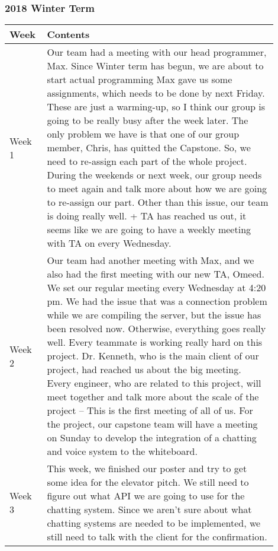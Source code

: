 \documentclass[10pt]{article}
\begin{document}
        \subsubsection{2018 Winter Term}
            \begin{center}
            \begin{tabular}{ | p{0.1\linewidth} | p{0.8\linewidth} | } \hline
                Week & Contents  \\ \hline
                Week 1 &  Our team had a meeting with our head programmer, Max. Since Winter term has begun, we are about to start actual programming
                Max gave us some assignments, which needs to be done by next Friday.
                These are just a warming-up, so I think our group is going to be really busy after the week later.
                The only problem we have is that one of our group member, Chris, has quitted the Capstone.
                So, we need to re-assign each part of the whole project.
                During the weekends or next week, our group needs to meet again and talk more about how we are going to re-assign our part.
                Other than this issue, our team is doing really well.
                + TA has reached us out, it seems like we are going to have a weekly meeting with TA on every Wednesday.  \\ \hline
                Week 2 &  Our team had another meeting with Max, and we also had the first meeting with our new TA, Omeed.
                We set our regular meeting every Wednesday at 4:20 pm.
                We had the issue that was a connection problem while we are compiling the server, but the issue has been resolved now.
                Otherwise, everything goes really well. Every teammate is working really hard on this project.
                Dr. Kenneth, who is the main client of our project, had reached us about the big meeting.
                Every engineer, who are related to this project, will meet together and talk more about the scale of the project -- This is the first meeting of all of us.
                For the project, our capstone team will have a meeting on Sunday to develop the integration of a chatting and voice system to the whiteboard.
                 \\ \hline
                Week 3 &  This week, we finished our poster and try to get some idea for the elevator pitch.
                We still need to figure out what API we are going to use for the chatting system.
                Since we aren't sure about what chatting systems are needed to be implemented, we still need to talk with the client for the confirmation.

\end{tabular}
\end{center}
\end{document}
